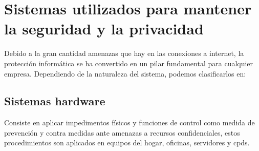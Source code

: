 \chapter{Sistemas utilizados para mantener la seguridad y la privacidad}
\label{cha:tipos-sistemas}
Debido a la gran cantidad amenazas que hay en las conexiones a internet,  la protección informática se ha convertido en un pilar fundamental para cualquier empresa\cite{tiposseguridad}. Dependiendo de la naturaleza del sistema, podemos clasificarlos en:
\section{Sistemas hardware}
Consiste en aplicar impedimentos físicos y funciones de control como medida de prevención y contra medidas ante amenazas a recursos confidenciales, estos procedimientos son aplicados en equipos del hogar, oficinas, servidores y cpds.
